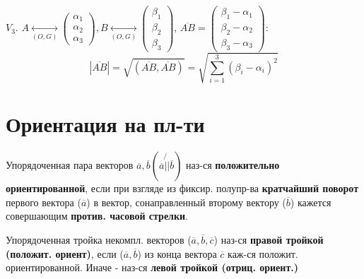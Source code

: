 \begin{consequence}
$V_3$. $A\underset{(O, G)}{\longleftrightarrow} \begin{pmatrix}\alpha_1 \\ \alpha_2 \\ \alpha_3 \end{pmatrix}, B \underset{(O, G)}{\longleftrightarrow} \begin{pmatrix}\beta_1 \\ \beta_2 \\ \beta_3 \end{pmatrix}$, $\overline{AB} = \begin{pmatrix}\beta_1 - \alpha_1 \\ \beta_2 - \alpha_2 \\ \beta_3 - \alpha_3 \end{pmatrix}$:
\[
|\overline{AB}| = \sqrt{(\overline{AB}, \overline{AB})} = \sqrt{\sum_{i = 1}^{3} (\beta_i - \alpha_i)^{2}}
\] 
\end{consequence}

\section{Ориентация на пл-ти}

\begin{definition}
Упорядоченная пара векторов $\overline{a}, \overline{b} (\overline{a} \not{||} \overline{b})$ наз-ся \textbf{положительно ориентированной}, если при взгляде из фиксир. полупр-ва \textbf{кратчайший поворот} первого вектора ($\overline{a}$) в вектор, сонаправленный второму вектору ($\overline{b}$) кажется совершающим \textbf{против. часовой стрелки}.
\end{definition}

\begin{definition}
Упорядоченная тройка некомпл. векторов ($\overline{a}, \overline{b}, \overline{c}$) наз-ся \textbf{правой тройкой (положит. ориент)}, если ($\overline{a}, \overline{b}$) из конца вектора $\overline{c}$ каж-ся положит. ориентированной.
Иначе - наз-ся \textbf{левой тройкой (отриц. ориент.)}
\end{definition}

